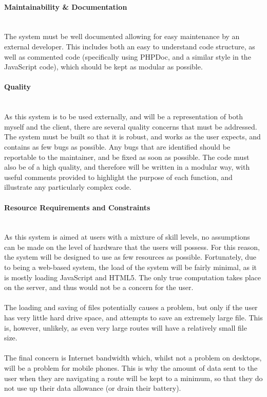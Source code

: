 \paragraph{Maintainability \& Documentation}\ \\
The system must be well documented allowing for easy maintenance by an external developer. This includes both an easy to understand code structure, as well as commented code (specifically using PHPDoc, and a similar style in the JavaScript code), which should be kept as modular as possible.

\paragraph{Quality}\ \\
As this system is to be used externally, and will be a representation of both myself and the client, there are several quality concerns that must be addressed. The system must be built so that it is robust, and works as the user expects, and contains as few bugs as possible. Any bugs that are identified should be reportable to the maintainer, and be fixed as soon as possible. The code must also be of a high quality, and therefore will be written in a modular way, with useful comments provided to highlight the purpose of each function, and illustrate any particularly complex code.

\paragraph{Resource Requirements and Constraints}\ \\
As this system is aimed at users with a mixture of skill levels, no assumptions can be made on the level of hardware that the users will possess. For this reason, the system will be designed to use as few resources as possible. Fortunately, due to being a web-based system, the load of the system will be fairly minimal, as it is mostly loading JavaScript and HTML5. The only true computation takes place on the server, and thus would not be a concern for the user.\ \\
\ \\
The loading and saving of files potentially causes a problem, but only if the user has very little hard drive space, and attempts to save an extremely large file. This is, however, unlikely, as even very large routes will have a relatively small file size.\ \\
\ \\
The final concern is Internet bandwidth which, whilst not a problem on desktops, will be a problem for mobile phones. This is why the amount of data sent to the user when they are navigating a route will be kept to a minimum, so that they do not use up their data allowance (or drain their battery).

